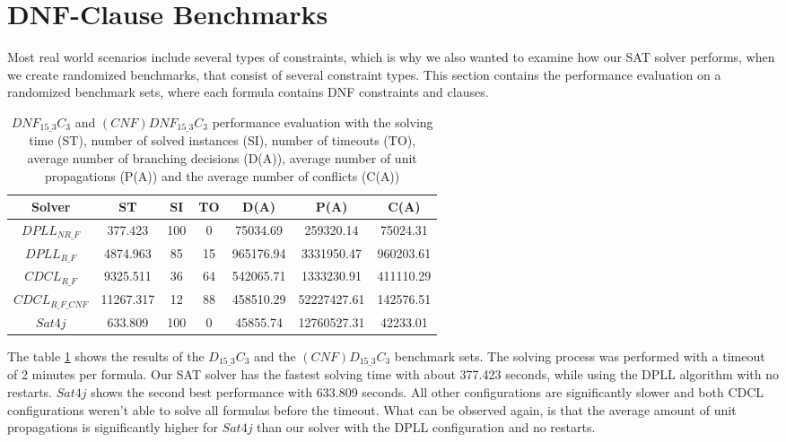 \section{DNF-Clause Benchmarks}

Most real world scenarios include several types of constraints, which is why we also wanted to examine how our SAT solver performs, when we create randomized benchmarks, that consist of several constraint types. This section contains the performance evaluation on a randomized benchmark sets, where each formula contains DNF constraints and clauses.


\begin{table}[!htb]
\centering
\caption[$DNF_{15\_3}C_3$ and $(CNF)DNF_{15\_3}C_3$ performance evaluation]{$DNF_{15\_3}C_3$ and $(CNF)DNF_{15\_3}C_3$ performance evaluation with the solving time (ST), number of solved instances (SI), number of timeouts (TO), average number of branching decisions (D(A)), average number of unit propagations (P(A)) and the average number of conflicts (C(A))}
\label{tab:dnfClauseBenchmarkSAT}
\begin{tabular}{|c|c|c|c|c|c|c|}
\hline
Solver & ST & SI & TO & D(A) & P(A) & C(A)\\ 
\hline
$DPLL_{NR\_F}$ & 377.423 & 100 & 0 & 75034.69 & 259320.14 & 75024.31 \\ 
\hline
$DPLL_{R\_F}$ & 4874.963 & 85 & 15 & 965176.94 & 3331950.47 & 960203.61 \\ 
\hline
$CDCL_{R\_F}$ & 9325.511 & 36 & 64 & 542065.71 & 1333230.91 & 411110.29 \\ 
\hline
$CDCL_{R\_F\_CNF}$ & 11267.317 & 12 & 88 & 458510.29 & 52227427.61 & 142576.51 \\ 
\hline
$Sat4j$ & 633.809 & 100 & 0 & 45855.74 & 12760527.31 & 42233.01 \\ 
\hline
\end{tabular}
\end{table}

The table \ref{tab:dnfClauseBenchmarkSAT} shows the results of the $D_{15\_3}C_3$ and the $(CNF)D_{15\_3}C_3$ benchmark sets. The solving process was performed with a timeout of 2 minutes per formula. Our SAT solver has the fastest solving time with about 377.423 seconds, while using the DPLL algorithm with no restarts. $Sat4j$ shows the second best performance with 633.809 seconds. All other configurations are significantly slower and both CDCL configurations weren't able to solve all formulas before the timeout. What can be observed again, is that the average amount of unit propagations is significantly higher for $Sat4j$ than our solver with the DPLL configuration and no restarts.

